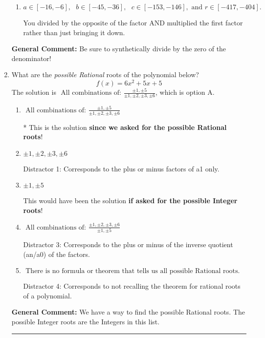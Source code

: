 \documentclass{extbook}[14pt]
\newcommand{\litem}[1]{\item #1

\rule{\textwidth}{0.4pt}}
\begin{document}
\begin{enumerate}
{\begin{enumerate}[label=\Alph*.]
 You multiplied by the synthetic number rather than bringing the first factor down.
\item \( a \in [-16, -6], \text{   } b \in [-45, -36], \text{   } c \in [-153, -146], \text{   and   } r \in [-417, -404]. \)

 You divided by the opposite of the factor AND multiplied the first factor rather than just bringing it down.
\end{enumerate}

\textbf{General Comment:} Be sure to synthetically divide by the zero of the denominator!
}
\litem{
What are the \textit{possible Rational} roots of the polynomial below?
\[ f(x) = 6x^{2} +5 x + 5 \]The solution is \( \text{ All combinations of: }\frac{\pm 1,\pm 5}{\pm 1,\pm 2,\pm 3,\pm 6} \), which is option A.\begin{enumerate}[label=\Alph*.]
\item \( \text{ All combinations of: }\frac{\pm 1,\pm 5}{\pm 1,\pm 2,\pm 3,\pm 6} \)

* This is the solution \textbf{since we asked for the possible Rational roots}!
\item \( \pm 1,\pm 2,\pm 3,\pm 6 \)

 Distractor 1: Corresponds to the plus or minus factors of a1 only.
\item \( \pm 1,\pm 5 \)

This would have been the solution \textbf{if asked for the possible Integer roots}!
\item \( \text{ All combinations of: }\frac{\pm 1,\pm 2,\pm 3,\pm 6}{\pm 1,\pm 5} \)

 Distractor 3: Corresponds to the plus or minus of the inverse quotient (an/a0) of the factors. 
\item \( \text{ There is no formula or theorem that tells us all possible Rational roots.} \)

 Distractor 4: Corresponds to not recalling the theorem for rational roots of a polynomial.
\end{enumerate}

\textbf{General Comment:} We have a way to find the possible Rational roots. The possible Integer roots are the Integers in this list.
}
\end{enumerate}
\end{document}
